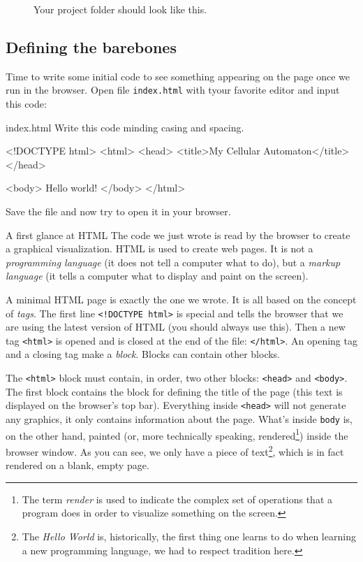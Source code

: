%
\begin{figure}[b]
\sidecaption

%
%
\caption{Your project folder should look like this.}
\label{fig:dirstruct1}
\end{figure}
%

\subsection{Defining the barebones}
Time to write some initial code to see something appearing on the page once we run in the browser.
Open file \texttt{index.html} with tyour favorite editor and input this code:

\begin{programcode}{index.html}
Write this code minding casing and spacing.
\begin{codehtml}
<!DOCTYPE html>
<html>
<head>
  <title>My Cellular Automaton</title>
</head>

<body>
  Hello world!
</body>
</html>
\end{codehtml}
\end{programcode}

Save the file and now try to open it in your browser.

\begin{tips}{A first glance at HTML}
The code we just wrote is read by the browser to create a graphical visualization. HTML is used to
create web pages. It is not a \textit{programming language} (it does not tell a computer what to do),
but a \textit{markup language} (it tells a computer what to display and paint on the screen).

A minimal HTML page is exactly the one we wrote. It is all based on the concept of \textit{tags}. The
first line \texttt{<!DOCTYPE html>} is special and tells the browser that we are using the latest
version of HTML (you should always use this). Then a new tag \texttt{<html>} is opened and is
closed at the end of the file: \texttt{</html>}. An opening tag and a closing tag make a \textit{block}.
Blocks can contain other blocks.

The \texttt{<html>} block must contain, in order, two other blocks:
\texttt{<head>} and \texttt{<body>}. The first block contains the block for defining the title of the page
(this text is displayed on the browser's top bar). Everything inside \texttt{<head>} will not generate any 
graphics, it only contains information about the page. What's inside \texttt{body} is, on the other hand, 
painted (or, more technically speaking, rendered\footnote{The term \textit{render} is used to indicate
the complex set of operations that a program does in order to visualize something on the screen.})
inside the browser window. As you can see, we only have a piece of 
text\footnote{The \textit{Hello World} is, historically, the first thing one learns
to do when learning a new programming language, we had to respect tradition here.}, which
is in fact rendered on a blank, empty page.
\end{tips}

